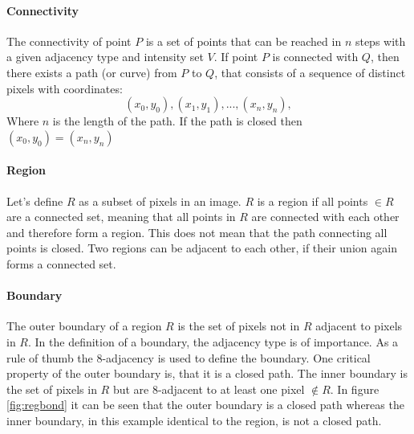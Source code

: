 \paragraph{Connectivity}
The connectivity of point $P$ is a set of points that can be reached in $n$ steps with a given adjacency type and intensity set $V$. If point $P$ is connected with $Q$, then there exists a path (or curve) from $P$ to $Q$, that consists of a sequence of distinct pixels with coordinates:
\begin{equation*}
    (x_0,y_0),(x_1,y_1),...,(x_n,y_n), 
\end{equation*}
Where $n$ is the length of the path. If the path is closed then $(x_0,y_0) = (x_n,y_n)$
\paragraph{Region}
Let's define $R$ as a subset of pixels in an image. $R$ is a region if all points $\in R$ are a connected set, meaning that all points in $R$ are connected with each other and therefore form a region. This does not mean that the path connecting all points is closed. Two regions can be adjacent to each other, if their union again forms a connected set. 

\paragraph{Boundary}
The outer boundary of a region $R$ is the set of pixels not in $R$ adjacent to pixels in $R$. In the definition of a boundary, the adjacency type is of importance. As a rule of thumb the 8-adjacency is used to define the boundary. One critical property of the outer boundary is, that it is a closed path. The inner boundary is the set of pixels in $R$ but are 8-adjacent to at least one pixel $\notin  R$. In figure \ref{fig:regbond} it can be seen that the outer boundary is a closed path whereas the inner boundary, in this example identical to the region, is not a closed path.

